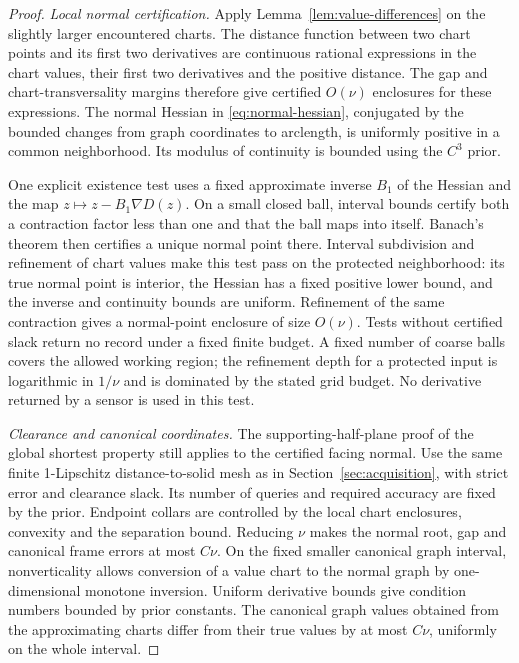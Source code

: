 \begin{proof}
\emph{Local normal certification.}
Apply Lemma~\ref{lem:value-differences} on the slightly larger
encountered charts. The distance function between two chart points and
its first two derivatives are continuous rational expressions in the
chart values, their first two derivatives and the positive distance.
The gap and chart-transversality margins therefore give certified
$O(\nu)$ enclosures for these expressions. The normal Hessian in
\eqref{eq:normal-hessian}, conjugated by the bounded changes from graph
coordinates to arclength, is uniformly positive in a common neighborhood.
Its modulus of continuity is bounded using the $C^3$ prior.

One explicit existence test uses a fixed approximate inverse $B_1$ of
the Hessian and the map $z\mapsto z-B_1\nabla D(z)$. On a small
closed ball, interval bounds certify both a contraction factor less than
one and that the ball maps into itself. Banach's theorem then certifies
a unique normal point there. Interval subdivision and refinement of
chart values make this test pass on the protected neighborhood: its true
normal point is interior, the Hessian has a fixed positive lower bound,
and the inverse and continuity bounds are uniform. Refinement of the
same contraction gives a normal-point enclosure of size $O(\nu)$.
Tests without certified slack return no record under a fixed finite
budget. A fixed number of coarse balls covers the allowed working
region; the refinement depth for a protected input is logarithmic in
$1/\nu$ and is dominated by the stated grid budget. No derivative
returned by a sensor is used in this test.

\emph{Clearance and canonical coordinates.}
The supporting-half-plane proof of the global shortest property still
applies to the certified facing normal. Use the same finite
1-Lipschitz distance-to-solid mesh as in Section~\ref{sec:acquisition},
with strict error and clearance slack. Its number of queries and required
accuracy are fixed by the prior. Endpoint collars are controlled by the
local chart enclosures, convexity and the separation bound. Reducing
$\nu$ makes the normal root, gap and canonical frame errors at most
$C\nu$. On the fixed smaller canonical graph interval, nonverticality
allows conversion of a value chart to the normal graph by one-dimensional
monotone inversion. Uniform derivative bounds give condition numbers
bounded by prior constants. The canonical graph values obtained from
the approximating charts differ from their true values by at most
$C\nu$, uniformly on the whole interval.


\end{proof}
